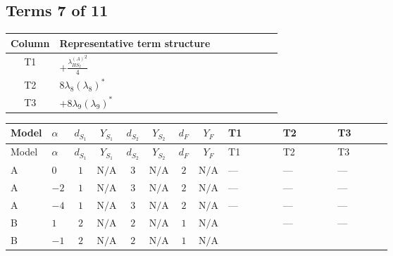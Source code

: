 \documentclass[8pt]{article}
\begin{document}
\begin{landscape}
\subsection*{Terms 7 of 11}
\begin{center}
\begin{tabular}{@{}c >{\raggedright\arraybackslash}p{0.82\linewidth}@{}}
\toprule
Column & Representative term structure \\
\midrule
T1 & \(\displaystyle +\frac{{\lambda_{HS_2}^{(A)}}^2}{4}\) \\
\midrule
T2 & \(\displaystyle 8 {\lambda_{8}} \left({\lambda_{8}}\right)^{*}\) \\
\midrule
T3 & \(\displaystyle +8 {\lambda_{9}} \left({\lambda_{9}}\right)^{*}\) \\
\midrule
\bottomrule
\end{tabular}
\end{center}
\smallskip
\tiny
\begin{longtable}{@{}llcccccc >{\raggedright\arraybackslash}p{0.21\linewidth} >{\raggedright\arraybackslash}p{0.21\linewidth} >{\raggedright\arraybackslash}p{0.21\linewidth}@{}}
\toprule
Model & $\alpha$ & $d_{S_1}$ & $Y_{S_1}$ & $d_{S_2}$ & $Y_{S_2}$ & $d_F$ & $Y_F$ & T1 & T2 & T3 \\
\midrule
\endfirsthead
\toprule
Model & $\alpha$ & $d_{S_1}$ & $Y_{S_1}$ & $d_{S_2}$ & $Y_{S_2}$ & $d_F$ & $Y_F$ & T1 & T2 & T3 \\
\midrule
\endhead
A & $0$ & $1$ & $\text{N/A}$ & $3$ & $\text{N/A}$ & $2$ & $\text{N/A}$ & --- & --- & --- \\
\midrule
A & $-2$ & $1$ & $\text{N/A}$ & $3$ & $\text{N/A}$ & $2$ & $\text{N/A}$ & --- & --- & --- \\
\midrule
A & $-4$ & $1$ & $\text{N/A}$ & $3$ & $\text{N/A}$ & $2$ & $\text{N/A}$ & --- & --- & --- \\
\midrule
B & $1$ & $2$ & $\text{N/A}$ & $2$ & $\text{N/A}$ & $1$ & $\text{N/A}$ & \scriptsize\adjustbox{max width=\linewidth}{$\begin{gathered} +\frac{{\lambda_{HS_2}^{(A)}}^2}{4}\end{gathered}$} & --- & --- \\
\midrule
B & $-1$ & $2$ & $\text{N/A}$ & $2$ & $\text{N/A}$ & $1$ & $\text{N/A}$ & \scriptsize\adjustbox{max width=\linewidth}{$\begin{gathered} +\frac{{\lambda_{HS_2}^{(A)}}^2}{4}\end{gathered}$} & \scriptsize\adjustbox{max width=\linewidth}{$\begin{gathered} 8 {\lambda_{8}} \left({\lambda_{8}}\right)^{*}\end{gathered}$} & \scriptsize\adjustbox{max width=\linewidth}{$\begin{gathered} +8 {\lambda_{9}} \left({\lambda_{9}}\right)^{*}\end{gathered}$} \\

\end{longtable}
\end{landscape}
\end{document}
